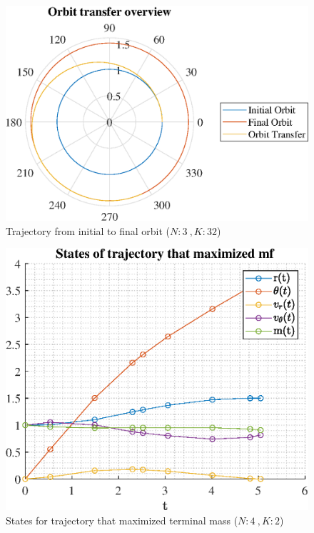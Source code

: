 \documentclass[]{article}
\begin{document}
	\begin{figure}
		\centering
		\includegraphics[scale=0.75]{orbit_N3_K32_C2_mf.eps}
		\caption{Trajectory from initial to final orbit (\(N:3\ , K:32\))}
		\label{fig:orbit_N3_K32_C2_mf}
	\end{figure}
	\begin{figure}
		\centering
		\includegraphics[scale=0.75]{states_N4_K2_C2_mf.eps}
		\caption{States for trajectory that maximized terminal mass (\(N:4\ , K:2\))}
		\label{fig:states_N4_K2_C2_mf}
	\end{figure}
\end{document}
